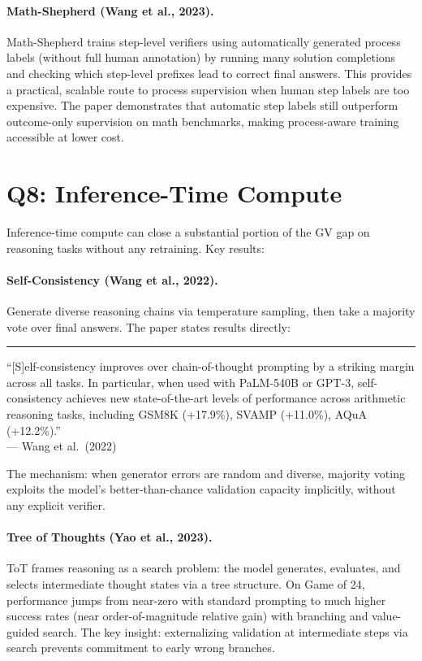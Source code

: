 \documentclass[11pt]{article}
\newenvironment{paperquote}{%
  \vspace{0.5em}%
  \begin{list}{}{%
    \setlength{\leftmargin}{1.5em}%
    \setlength{\rightmargin}{0em}%
    \setlength{\topsep}{0.2em}%
    \setlength{\parsep}{0pt}%
  }%
  \item\relax\small\itshape\leavevmode%
  \hspace{-1.3em}\textcolor{gray!80}{\rule{2pt}{1em}}\hspace{0.5em}%
}{%
  \end{list}%
  \vspace{0.3em}%
}
\begin{document}
\paragraph{Math-Shepherd (Wang et al., 2023).}
Math-Shepherd trains step-level verifiers using automatically generated process labels (without full human annotation) by running many solution completions and checking which step-level prefixes lead to correct final answers. This provides a practical, scalable route to process supervision when human step labels are too expensive. The paper demonstrates that automatic step labels still outperform outcome-only supervision on math benchmarks, making process-aware training accessible at lower cost.

\section{Q8: Inference-Time Compute}

Inference-time compute can close a substantial portion of the GV gap on reasoning tasks without any retraining. Key results:

\paragraph{Self-Consistency (Wang et al., 2022).}
Generate diverse reasoning chains via temperature sampling, then take a majority vote over final answers. The paper states results directly:

\begin{paperquote}
\small ``[S]elf-consistency improves over chain-of-thought prompting by a striking margin across all tasks. In particular, when used with PaLM-540B or GPT-3, self-consistency achieves new state-of-the-art levels of performance across arithmetic reasoning tasks, including GSM8K (+17.9\%), SVAMP (+11.0\%), AQuA (+12.2\%).''\\
\hfill --- Wang et al.\ (2022)
\end{paperquote}

The mechanism: when generator errors are random and diverse, majority voting exploits the model's better-than-chance validation capacity implicitly, without any explicit verifier.

\paragraph{Tree of Thoughts (Yao et al., 2023).}
ToT frames reasoning as a search problem: the model generates, evaluates, and selects intermediate thought states via a tree structure. On Game of 24, performance jumps from near-zero with standard prompting to much higher success rates (near order-of-magnitude relative gain) with branching and value-guided search. The key insight: externalizing validation at intermediate steps via search prevents commitment to early wrong branches.
\end{document}

